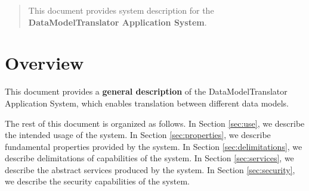 \documentclass[a4paper]{arrowhead}
\begin{document}
\ArrowheadDate{\today}
\ArrowheadSetup

\begin{center}
  \vspace*{1cm}
  \huge{\arrowtitle}

  \vspace*{0.2cm}
  \LARGE{\arrowtype}
  \vspace*{1cm}

  \vspace*{\fill}


  \vspace*{1cm}
  \vspace*{\fill}

  \begin{abstract}
    This document provides system description for the \textbf{DataModelTranslator Application System}.
  \end{abstract}

  \vspace*{1cm}

 \end{center}

\newpage

\tableofcontents
\newpage

\section{Overview}
\label{sec:overview}
\color{black}
This document provides a \textbf{general description} of the DataModelTranslator Application System, which enables translation between different data models.

The rest of this document is organized as follows.
In Section \ref{sec:use}, we describe the intended usage of the system.
In Section \ref{sec:properties}, we describe fundamental properties
provided by the system.
In Section \ref{sec:delimitations}, we describe delimitations of capabilities
of the system.
In Section \ref{sec:services}, we describe the abstract services produced by the system.
In Section \ref{sec:security}, we describe the security capabilities
of the system.
\end{document}
